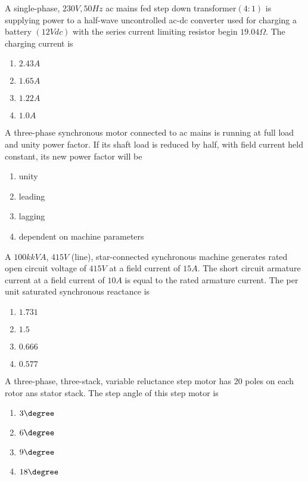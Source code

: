 \item A single-phase, $230V,50Hz$ ac mains fed step down transformer$(4:1)$ is supplying power to a half-wave uncontrolled ac-dc converter used for charging a battery $(12 V dc)$ with the series current limiting resistor begin $19.04\Omega$. The charging current is 
\begin{enumerate}
    \item $2.43 A$
    \item $1.65 A$
    \item $1.22 A$
    \item $1.0 A $ \\
\end{enumerate}

\item A three-phase synchronous motor connected to ac mains is running at full load and unity power factor. If its shaft load is reduced by half, with field current held constant, its new power factor will be 
\begin{enumerate}
    \item unity
    \item leading
    \item lagging 
    \item dependent on machine parameters \\
\end{enumerate} 

\item A $100k kVA$, $415 V$ (line), star-connected synchronous machine generates rated open circuit voltage of $415 V$ at a field current of $15 A$. The short circuit armature current at a field current of $10 A$ is equal to the rated armature current. The per unit saturated synchronous reactance is
\begin{enumerate}
    \item $1.731$
    \item $1.5$
    \item $0.666$
    \item $0.577$
\end{enumerate}

\item A three-phase, three-stack, variable reluctance step motor has 20 poles on each rotor ans stator stack. The step angle of this step motor is
\begin{enumerate}
    \item $3 \degree$
    \item $6 \degree$
    \item $9 \degree$
    \item $18 \degree$\\
\end{enumerate}

